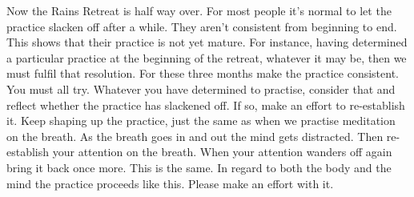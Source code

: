 Now the Rains Retreat is half way over. For most people it's normal to let the practice slacken off after a while. They aren't consistent from beginning to end. This shows that their practice is not yet mature. For instance, having determined a particular practice at the beginning of the retreat, whatever it may be, then we must fulfil that resolution. For these three months make the practice consistent. You must all try. Whatever you have determined to practise, consider that and reflect whether the practice has slackened off. If so, make an effort to re-establish it. Keep shaping up the practice, just the same as when we practise meditation on the breath. As the breath goes in and out the mind gets distracted. Then re-establish your attention on the breath. When your attention wanders off again bring it back once more. This is the same. In regard to both the body and the mind the practice proceeds like this. Please make an effort with it.

